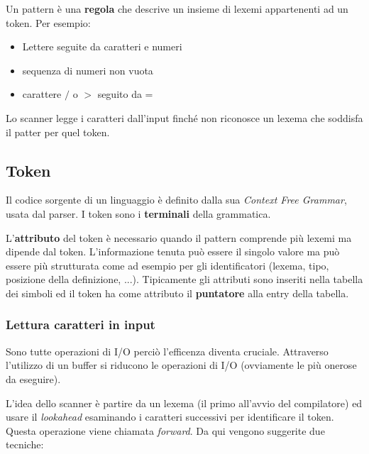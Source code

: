 \begin{definition}[Pattern]
Un pattern è una \textbf{regola} che descrive un insieme di lexemi appartenenti
ad un token. Per esempio:
\begin{itemize}
\item Lettere seguite da caratteri e numeri
\item sequenza di numeri non vuota
\item carattere $/$ o $>$ seguito da =
\end{itemize}
\end{definition}

Lo scanner legge i caratteri dall'input finché non riconosce un lexema che
soddisfa il patter per quel token.

\subsection{Token}
\label{sec:token}
Il codice sorgente di un linguaggio è definito dalla sua
\textit{Context Free Grammar}, usata dal parser. I token sono i
\textbf{terminali} della grammatica.

L'\textbf{attributo} del token è necessario quando il pattern comprende più
lexemi ma dipende dal token. L'informazione tenuta può essere il singolo valore
ma può essere più strutturata come ad esempio per gli identificatori (lexema,
tipo, posizione della definizione, ...). Tipicamente gli attributi sono
inseriti nella tabella dei simboli ed il token ha come attributo il
\textbf{puntatore} alla entry della tabella.

\subsubsection{Lettura caratteri in input}
Sono tutte operazioni di I/O perciò l'efficenza diventa cruciale. Attraverso
l'utilizzo di un buffer si riducono le operazioni di I/O (ovviamente le più
onerose da eseguire).

L'idea dello scanner è partire da un lexema (il primo all'avvio del compilatore)
ed usare il \textit{lookahead} esaminando i caratteri successivi per
identificare il token. Questa operazione viene chiamata \textit{forward}. Da qui
vengono suggerite due tecniche:

